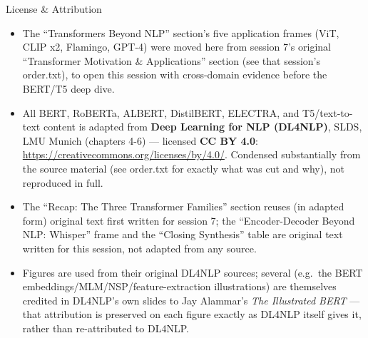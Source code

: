 \begin{vbframe}{License \& Attribution}
\begin{itemize}
\item The \enquote{Transformers Beyond NLP} section's five application frames (ViT, CLIP x2, Flamingo, GPT-4) were moved here from session 7's original \enquote{Transformer Motivation \& Applications} section (see that session's order.txt), to open this session with cross-domain evidence before the BERT/T5 deep dive.
\item All BERT, RoBERTa, ALBERT, DistilBERT, ELECTRA, and T5/text-to-text content is adapted from \textbf{Deep Learning for NLP (DL4NLP)}, SLDS, LMU Munich (chapters 4-6) --- licensed \textbf{CC BY 4.0}: \url{https://creativecommons.org/licenses/by/4.0/}. Condensed substantially from the source material (see order.txt for exactly what was cut and why), not reproduced in full.
\item The \enquote{Recap: The Three Transformer Families} section reuses (in adapted form) original text first written for session 7; the \enquote{Encoder-Decoder Beyond NLP: Whisper} frame and the \enquote{Closing Synthesis} table are original text written for this session, not adapted from any source.
\item Figures are used from their original DL4NLP sources; several (e.g.\ the BERT embeddings/MLM/NSP/feature-extraction illustrations) are themselves credited in DL4NLP's own slides to Jay Alammar's \textit{The Illustrated BERT} --- that attribution is preserved on each figure exactly as DL4NLP itself gives it, rather than re-attributed to DL4NLP.
\end{itemize}
\end{vbframe}

\endlecture

